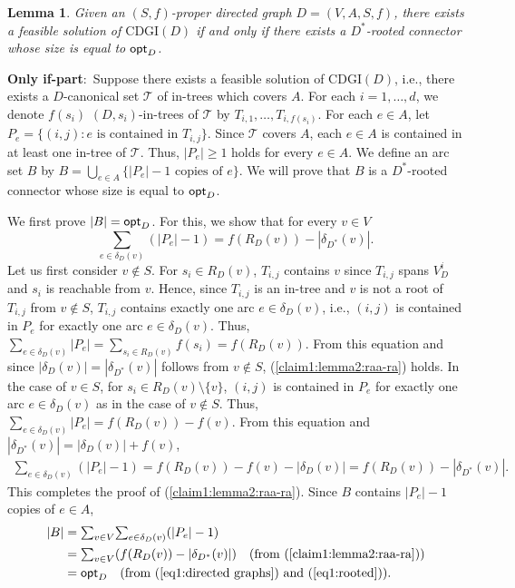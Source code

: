 \documentclass[11pt]{article}
\newcounter{ni}
\theoremstyle{plain}
\newtheorem{lemma}[theorem]{Lemma}\newtheorem{corollary}[theorem]{Corollary}\newtheorem{definition}[theorem]{Definition}\newtheorem{proposition}[theorem]{Proposition}\newtheorem{claim}[theorem]{Claim}\newtheorem{fact}[theorem]{Fact}\newtheorem{example}{Example}
\newcommand{\eop}{\hfill \usebox{\ProofSym}}
\newenvironment{proof}{\noindent {\it Proof.}}{\eop\par\vspace{0.3cm}}
\begin{document}
\begin{lemma} \label{lemma2:raa-ra}
Given an $(S,f)$-proper
directed graph  $D=(V,A,S,f)$, there exists a feasible solution of $\mbox{CDGI}(D)$
if and only if there exists a $D^{\ast}$-rooted connector whose size is equal to ${\sf opt}_D$. 
\end{lemma}
\begin{proof}
{\bf Only if-part$\colon$}
Suppose there exists a feasible solution of $\mbox{CDGI}(D)$, i.e., 
there exists a $D$-canonical set $\mathcal{T}$ of in-trees which covers $A$. 
For each $i=1,\ldots,d$, we denote $f(s_i)$ $(D,s_i)$-in-trees of $\mathcal{T}$ 
by $T_{i,1},\ldots,T_{i,f(s_i)}$.
For each $e \in A$, let $P_e=\{(i,j)\colon e \mbox{ is contained in }T_{i,j}\}$.
Since $\mathcal{T}$ covers $A$, 
each $e \in A$ is contained in at least one in-tree of $\mathcal{T}$. 
Thus, $|P_e|\ge 1$ holds for every $e \in A$. 
We define an arc set $B$ by 
$B = \bigcup_{e \in A}\{|P_e| - 1\mbox{ copies of }e\}$. 
We will prove that $B$ is a $D^{\ast}$-rooted 
connector whose size is equal to ${\sf opt}_D$.  

We first prove $|B|={\sf opt}_D$. For this, 
we show that for every $v \in V$ 
\begin{equation} \label{claim1:lemma2:raa-ra}
\mbox{$\sum$}_{e \in \delta_D(v)}(|P_e|-1)=f(R_D(v))-|\delta_{D^{\ast}}(v)|.
\end{equation}
Let us first consider $v \notin S$. 
For $s_i \in R_D(v)$, $T_{i,j}$ contains $v$
since $T_{i,j}$ spans $V^i_D$ and $s_i$ is reachable from $v$. 
Hence, 
since $T_{i,j}$ is an in-tree and $v$ is not a root of $T_{i,j}$ from $v \notin S$, 
$T_{i,j}$ contains exactly one arc $e \in \delta_{D}(v)$, i.e., 
$(i,j)$ is contained in $P_e$ for exactly one arc $e \in \delta_D(v)$. 
Thus, 
$\mbox{$\sum$}_{e \in \delta_D(v)}|P_e|=
\sum_{s_i \in R_D(v)}f(s_i)
=f(R_D(v))$.
From this equation and since $|\delta_D(v)|=|\delta_{D^{\ast}}(v)|$ follows from $v \notin S$, 
(\ref{claim1:lemma2:raa-ra}) holds. 
In the case of $v \in S$, for $s_i \in R_D(v)\setminus \{v\}$, 
$(i,j)$ is contained in $P_e$ for exactly one arc
$e \in \delta_D(v)$ as in the case of $v \notin S$. Thus, 
$\mbox{$\sum$}_{e \in \delta_D(v)}|P_e|=f(R_D(v))-f(v)$. 
From this equation and $|\delta_{D^{\ast}}(v)|=|\delta_D(v)|+f(v)$, 
\begin{align*} 
\mbox{$\sum$}_{e \in \delta_D(v)}(|P_e|-1)
= f(R_D(v))-f(v)-|\delta_D(v)| 
= f(R_D(v))-|\delta_{D^{\ast}}(v)|. 
\end{align*}
This completes the proof of (\ref{claim1:lemma2:raa-ra}).
Since $B$ contains $|P_e|-1$ copies of $e\in A$, 
\begin{align*} 
|B| &= \mbox{$\sum$}_{v \in V}\mbox{$\sum$}_{e \in \delta_D(v)}(|P_e|-1) \nonumber \\
&=\mbox{$\sum$}_{v \in V}(f(R_D(v))-|\delta_{D^{\ast}}(v)|) 
\ \ \ (\mbox{from (\ref{claim1:lemma2:raa-ra}}))\nonumber \\
&= {\sf opt}_D \ \ \ (\mbox{from (\ref{eq1:directed graphs}) and (\ref{eq1:rooted})}). 
\end{align*}


\end{proof}
\end{document}
